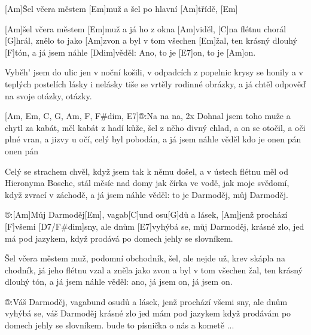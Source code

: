 
[Am]\null Šel včera městem [Em]muž 
a šel po hlavní [Am]třídě, [Em]

[Am]\null šel včera městem [Em]muž 
a já ho z okna [Am]viděl,
[C]na flétnu chorál [G]hrál, 
znělo to jako [Am]zvon
a byl v tom všechen [Em]\null žal, 
ten krásný dlouhý [F]tón,
a já jsem náhle [Ddim]věděl: 
Ano, to je [E7]on, to je [Am]on.

Vyběh' jsem do ulic jen v noční košili,
v odpadcích z popelnic krysy se honily
a v teplých postelích lásky i nelásky
tiše se vrtěly rodinné obrázky,
a já chtěl odpověď na svoje otázky, otázky.

[Am, Em, C, G, Am, F, F#dim, E7]\null®:Na na na, 2x
Dohnal jsem toho muže a chytl za kabát,
měl kabát z hadí kůže, šel z něho divný chlad,
a on se otočil, a oči plné vran,
a jizvy u očí, celý byl pobodán,
a já jsem náhle věděl kdo je onen pán onen pán
\slpc

Celý se strachem chvěl, 
když jsem tak k němu došel,
a v ústech flétnu měl od Hieronyma Bosche,
stál měsíc nad domy jak čírka ve vodě,
jak moje svědomí, když zvrací v záchodě,
a já jsem náhle věděl: 
to je Darmoděj, můj Darmoděj.

®:[Am]Můj Darmoděj[Em], 
vagab[C]und osu[G]dů a lásek,
[Am]jenž prochází [F]všemi [D7/F#dim]sny, 
ale dnům [E7]vyhýbá se,
můj Darmoděj, krásné zlo, 
jed má pod jazykem,
když prodává po domech jehly se slovníkem.

Šel včera městem muž, podomní obchodník,
šel, ale nejde už, krev skápla na chodník,
já jeho flétnu vzal a zněla jako zvon
a byl v tom všechen žal, ten krásný dlouhý tón,
a já jsem náhle věděl: 
ano, já jsem on, já jsem on.

®:Váš Darmoděj, vagabund osudů a lásek,
jenž prochází všemi sny, ale dnům vyhýbá se,
váš Darmoděj krásné zlo jed mám pod jazykem
když prodávám po domech jehly se slovníkem.
bude to písnička o nás a kometě ...